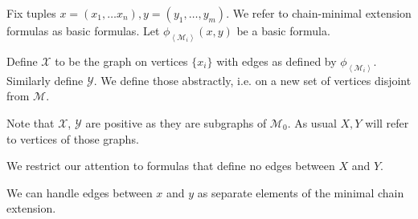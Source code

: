 \documentclass{amsart}
\newcommand{\MM}{\mathscr M}
\newcommand{\M}{\mathcal M}
\newcommand{\X}{\mathcal X}
\newcommand{\Y}{\mathcal Y}
\newcommand{\curly}[1]{\left\{#1\right\}}
\newcommand{\agl}[1]{\left\langle #1 \right\rangle}
\begin{document}


Fix tuples $x = (x_1, \ldots x_n), y = (y_1, \ldots, y_m)$.
We refer to chain-minimal extension formulas as basic formulas.
Let $\phi_{\agl{\M_i}}(x, y)$ be a basic formula.

\begin{Definition}
	Define $\X$ to be the graph on vertices $\{x_i\}$ with edges as defined by $\phi_{\agl{\M_i}}$.
	Similarly define $\Y$.
	We define those abstractly, i.e. on a new set of vertices disjoint from $\MM$.
\end{Definition}

Note that $\X$, $\Y$ are positive as they are subgraphs of $\M_0$.
As usual $X, Y$ will refer to vertices of those graphs.

We restrict our attention to formulas that define no edges between $X$ and $Y$.

\begin{Note} \label{note_edges}
	We can handle edges between $x$ and $y$ as separate elements of the minimal chain extension.
\end{Note}

\end{document}
